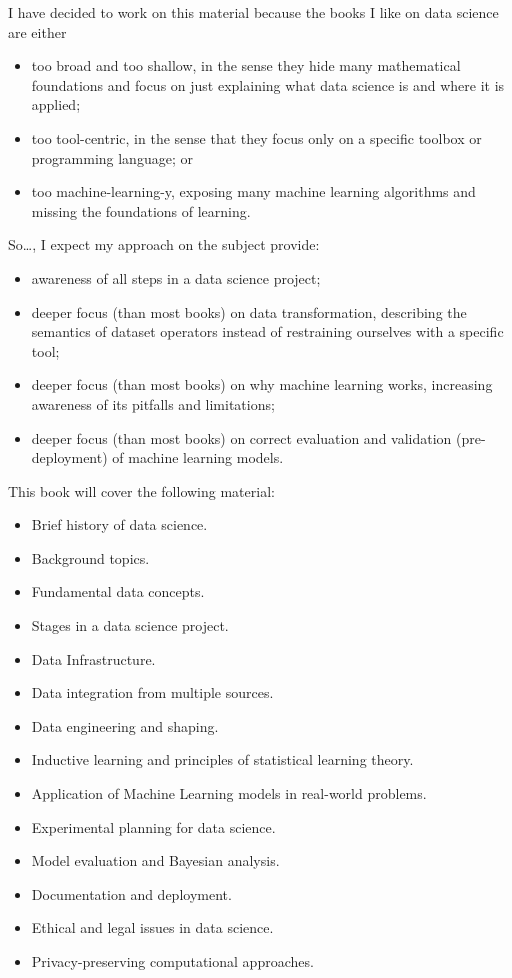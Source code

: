 I have decided to work on this material because the books I like on data science are
either
\begin{itemize}
  \item too broad and too shallow, in the sense they hide many mathematical foundations
    and focus on just explaining what data science is and where it is applied;
  \item too tool-centric, in the sense that they focus only on a specific toolbox or
    programming language; or
  \item too machine-learning-y, exposing many machine learning algorithms and missing the
    foundations of learning.
\end{itemize}

So\dots, I expect my approach on the subject provide:
\begin{itemize}
  \item awareness of all steps in a data science project;
  \item deeper focus (than most books) on data transformation, describing the semantics of dataset
    operators instead of restraining ourselves with a specific tool;
  \item deeper focus (than most books) on why machine learning works, increasing awareness of its pitfalls and
    limitations;
  \item deeper focus (than most books) on correct evaluation and validation
    (pre-deployment) of machine learning models.
\end{itemize}

This book will cover the following material:
\begin{itemize}
  \item Brief history of data science.
  \item Background topics.
  \item Fundamental data concepts.
  \item Stages in a data science project.
  \item Data Infrastructure.
  \item Data integration from multiple sources.
  \item Data engineering and shaping.
  \item Inductive learning and principles of statistical learning theory.
  \item Application of Machine Learning models in real-world problems.
  \item Experimental planning for data science.
  \item Model evaluation and Bayesian analysis.
  \item Documentation and deployment.
  \item Ethical and legal issues in data science.
  \item Privacy-preserving computational approaches.
\end{itemize}
